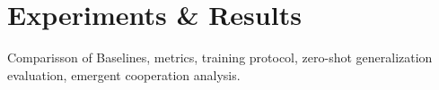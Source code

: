 \chapter{Experiments \& Results} \label{sec: experimentsResults}


Comparisson of Baselines, metrics, training protocol, zero-shot generalization evaluation, emergent cooperation analysis.